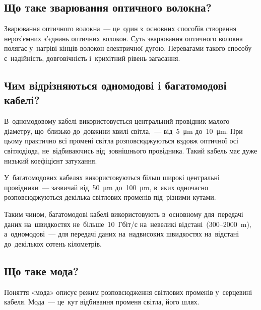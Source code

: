 \documentclass[
	a4paper,
	oneside,
	BCOR = 10mm,
	DIV = 12,
	12pt,
	headings = normal,
]{scrartcl}
\begin{document}
		\subsection{Що таке зварювання оптичного волокна?}
			Зварювання оптичного волокна~— це~один з~основних способів створення не\-роз'\-єм\-них з'єд\-нань оптичних волокон. Суть зварювання оптичного волокна полягає у~нагріві кінців волокон електричної дугою. Перевагами такого способу є~надійність, довговічність і~крихітний рівень загасання.

		\subsection{Чим відрізняються одномодові і багатомодові кабелі?}
			В~одномодовому кабелі використовується центральний провідник малого діаметру, що~близько до~довжини хвилі світла,~— від~\SI{5}{\micro\metre} до~\SI{10}{\micro\metre}. При цьому практично всі промені світла розповсюджуються вздовж оптичної осі світлодіода, не~відбиваючись від~зовнішнього провідника. Такий кабель має дуже низький коефіцієнт затухання.
			
			У~багатомодових кабелях використовуються більш широкі центральні провідники~— зазвичай від~\SI{50}{\micro\metre} до~\SI{100}{\micro\metre}, в~яких одночасно розповсюджуються декілька світлових променів під~різними кутами.

			Таким чином, багатомодові кабелі використовують в~основному для~передачі даних на~швидкостях не~більше~10~Гбіт/с на~невеликі відстані~(300–\SI{2000}{\metre}), а~одномодові~— для передачі даних на~надвисоких швидкостях на~відстані до~декількох сотень кілометрів.

		\subsection{Що таке мода?}
			Поняття «мода» описує режим розповсюдження світлових променів у~серцевині кабеля. Мода~— це~кут відбивання променя світла, його шлях.
\end{document}
